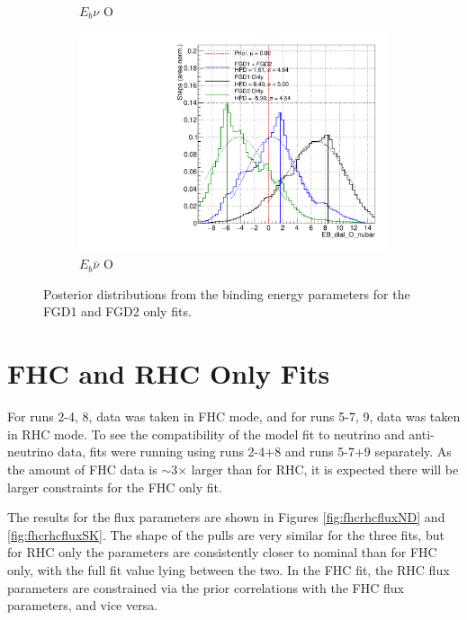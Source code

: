 \begin{figure}
\begin{subfigure}{.48\textwidth}
  \caption{$E_{b}\nu$ O}
\end{subfigure}
\begin{subfigure}{.48\textwidth}
  \centering
  \includegraphics[width=0.73\linewidth]{figs/FGD_EB_dial_O_nubar}
  \caption{$E_{b}\bar{\nu}$ O}
\end{subfigure}
\caption{Posterior distributions from the binding energy parameters for the FGD1 and FGD2 only fits.}
\label{fig:FGDEbdata}
\end{figure}

\section{FHC and RHC Only Fits}

For runs 2-4, 8, data was taken in FHC mode, and for runs 5-7, 9, data was taken in RHC mode. To see the compatibility of the model fit to neutrino and anti-neutrino data, fits were running using runs 2-4+8 and runs 5-7+9 separately. As the amount of FHC data is $\sim$3$\times$ larger than for RHC, it is expected there will be larger constraints for the FHC only fit.

The results for the flux parameters are shown in Figures \ref{fig:fhcrhcfluxND} and \ref{fig:fhcrhcfluxSK}. The shape of the pulls are very similar for the three fits, but for RHC only the parameters are consistently closer to nominal than for FHC only, with the full fit value lying between the two. In the FHC fit, the RHC flux parameters are constrained via the prior correlations with the FHC flux parameters, and vice versa.


